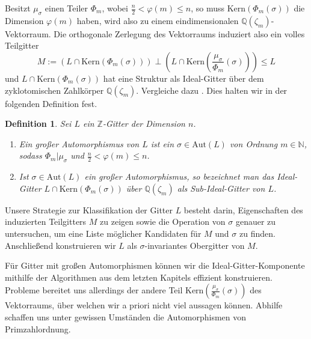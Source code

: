 \documentclass[12pt,a4paper,halfparskip,headsepline,bibtotocnumbered]{scrreprt}
\theoremstyle{nummermitklammern}
\newtheorem{definition}[defsatzusw]{Definition}
\theoremstyle{nonumberbreak}
\newcommand{\N}{\mathbb{N}}
\newcommand{\Z}{\mathbb{Z}}
\newcommand{\Q}{\mathbb{Q}}
\newcommand{\Kern}{\text{Kern}}
\newcommand{\Aut}{\text{Aut}}
\begin{document}
Besitzt $\mu_\sigma$ einen Teiler $\Phi_m$, wobei $\frac{n}{2} < \varphi(m) \leq n$, so muss $\Kern(\Phi_m(\sigma))$ die Dimension $\varphi(m)$ haben, wird also zu einem eindimensionalen $\Q(\zeta_m)$-Vektorraum. Die orthogonale Zerlegung des Vektorraums induziert also ein volles Teilgitter
\begin{equation*}
	M := \left(L \cap \Kern(\Phi_m(\sigma))\right) \perp \left(L \cap \Kern\left( \frac{\mu_\sigma}{\Phi_m} (\sigma) \right)\right) \leq L
\end{equation*}
und $L \cap \Kern(\Phi_m(\sigma))$ hat eine Struktur als Ideal-Gitter über dem zyklotomischen Zahlkörper $\Q(\zeta_m)$. Vergleiche dazu \cite[Abs. (5.3)]{nebe}. Dies halten wir in der folgenden Definition fest.

\begin{framed}
	\begin{definition}
		Sei $L$ ein $\Z$-Gitter der Dimension $n$.
		\begin{enumerate}[label=(\roman*)]
			\item Ein \textit{großer Automorphismus} von $L$ ist ein $\sigma \in \Aut(L)$ von Ordnung $m \in \N$, sodass $\Phi_m \vert \mu_\sigma$ und $\frac{n}{2} < \varphi(m) \leq n$.
			\item Ist $\sigma \in \Aut(L)$ ein großer Automorphismus, so bezeichnet man das Ideal-Gitter $L \cap  \Kern(\Phi_m(\sigma))$ über $\Q(\zeta_m)$ als \textit{Sub-Ideal-Gitter} von $L$.
		\end{enumerate}
	\end{definition}
\end{framed}

Unsere Strategie zur Klassifikation der Gitter $L$ besteht darin, Eigenschaften des induzierten Teilgitters $M$ zu zeigen sowie die Operation von $\sigma$ genauer zu untersuchen, um eine Liste möglicher Kandidaten für $M$ und $\sigma$ zu finden. Anschließend konstruieren wir $L$ als $\sigma$-invariantes Obergitter von $M$.\par
Für Gitter mit großen Automorphismen können wir die Ideal-Gitter-Komponente mithilfe der Algorithmen aus dem letzten Kapitels effizient konstruieren. Probleme bereitet uns allerdings der andere Teil $\Kern\left(\frac{\mu_\sigma}{\Phi_m}(\sigma)\right)$ des Vektorraums, über welchen wir a priori nicht viel aussagen können. Abhilfe schaffen uns unter gewissen Umständen die Automorphismen von Primzahlordnung.
\end{document}
